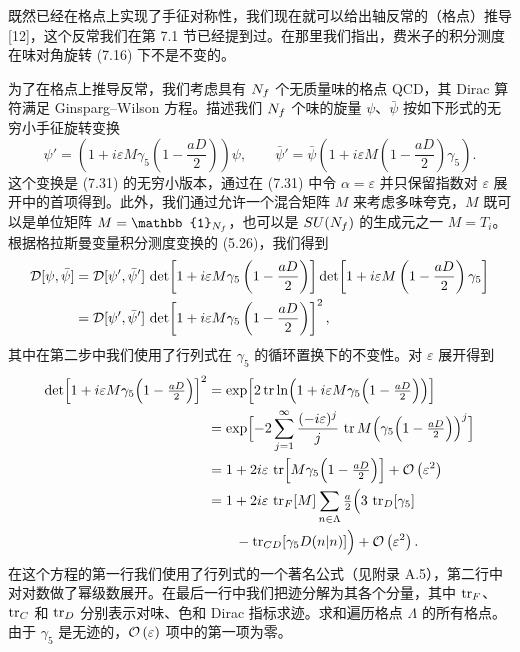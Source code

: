 既然已经在格点上实现了手征对称性，我们现在就可以给出轴反常的（格点）推导 [12]，这个反常我们在第 7.1 节已经提到过。在那里我们指出，费米子的积分测度在味对角旋转 (7.16) 下不是不变的。

为了在格点上推导反常，我们考虑具有 $N_f$ 个无质量味的格点 QCD，其 Dirac 算符满足 Ginsparg--Wilson 方程。描述我们 $N_f$ 个味的旋量 $\psi$、$\bar\psi$ 按如下形式的无穷小手征旋转变换
\begin{equation}
  \psi' = \left(1 + i\varepsilon M\gamma_5\left(1-\frac{aD}{2}\right)\right)\psi,
  \qquad
  \bar\psi' = \bar\psi\left(1 + i\varepsilon M\left(1-\frac{aD}{2}\right)\gamma_5\right).
\end{equation}
这个变换是 (7.31) 的无穷小版本，通过在 (7.31) 中令 $\alpha = \varepsilon$ 并只保留指数对 $\varepsilon$ 展开中的首项得到。此外，我们通过允许一个混合矩阵 $M$ 来考虑多味夸克，$M$ 既可以是单位矩阵 $M = \mathbb{1}_{\Nf}$，也可以是 $SU(N_f)$ 的生成元之一 $M = T_i$。根据格拉斯曼变量积分测度变换的 (5.26)，我们得到
\begin{align}
  \mathcal{D}[\psi,\bar\psi] &= \mathcal{D}[\psi',\bar\psi']\,
  \det\!\left[1 + i\varepsilon M\gamma_5\left(1-\frac{aD}{2}\right)\right]
  \det\!\left[1 + i\varepsilon M\left(1-\frac{aD}{2}\right)\gamma_5\right] \notag\\
  &= \mathcal{D}[\psi',\bar\psi']\,
  \det\!\left[1 + i\varepsilon M\gamma_5\left(1-\frac{aD}{2}\right)\right]^2,
\end{align}
其中在第二步中我们使用了行列式在 $\gamma_5$ 的循环置换下的不变性。对 $\varepsilon$ 展开得到
\begin{align}
  \det\Bigl[1 + i\varepsilon M\gamma_5\Bigl(1-\tfrac{aD}{2}\Bigr)\Bigr]^2
  &= \exp\Bigl[2\operatorname{tr}\ln\Bigl(1 + i\varepsilon M\gamma_5\Bigl(1-\tfrac{aD}{2}\Bigr)\Bigr)\Bigr] \notag\\
  &= \exp\Bigl[-2\sum_{j=1}^\infty \frac{(-i\varepsilon)^j}{j}\,
     \operatorname{tr} M\Bigl(\gamma_5\Bigl(1-\tfrac{aD}{2}\Bigr)\Bigr)^j\Bigr] \notag\\
  &= 1 + 2i\varepsilon\,\operatorname{tr}\Bigl[M\gamma_5\Bigl(1-\tfrac{aD}{2}\Bigr)\Bigr] + \mathcal{O}\left(\varepsilon^2\right) \notag\\
  &= 1 + 2i\varepsilon\,\operatorname{tr}_F[M]\sum_{n\in\Lambda}\tfrac{a}{2}\Bigl(3\,\operatorname{tr}_D[\gamma_5] \notag\\
  &\qquad - \operatorname{tr}_{CD}[\gamma_5 D(n|n)]\Bigr) + \mathcal{O}\left(\varepsilon^2\right).
\end{align}
在这个方程的第一行我们使用了行列式的一个著名公式（见附录 A.5），第二行中对对数做了幂级数展开。在最后一行中我们把迹分解为其各个分量，其中 $\operatorname{tr}_F$、$\operatorname{tr}_C$ 和 $\operatorname{tr}_D$ 分别表示对味、色和 Dirac 指标求迹。求和遍历格点 $\Lambda$ 的所有格点。由于 $\gamma_5$ 是无迹的，$\mathcal{O}\left(\varepsilon\right)$ 项中的第一项为零。

